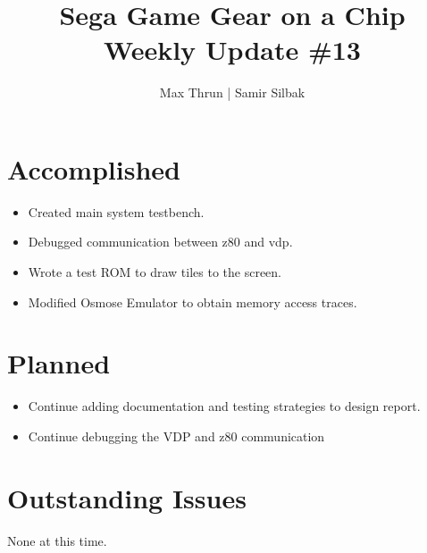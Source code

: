 \documentclass[12pt]{article}
\title{Sega Game Gear on a Chip \\ Weekly Update \#13}
\author{ Max Thrun | Samir Silbak }
\begin{document}
\maketitle

\section*{Accomplished}
\begin{itemize}
    \item Created main system testbench.
    \item Debugged communication between z80 and vdp.
    \item Wrote a test ROM to draw tiles to the screen.
    \item Modified Osmose Emulator to obtain memory access traces.
\end{itemize}

\section*{Planned}
\begin{itemize}
    \item Continue adding documentation and testing strategies to design report.
    \item Continue debugging the VDP and z80 communication
\end{itemize}

\section*{Outstanding Issues}
None at this time.

\vspace{.1in}
\end{document}
